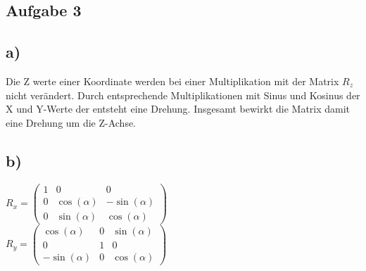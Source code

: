 \documentclass{article}
\begin{document}
	\subsection*{Aufgabe 3}
	\subsection*{a)}
	Die Z werte einer Koordinate werden bei einer Multiplikation mit der Matrix $R_{z}$ nicht verändert. Durch entsprechende Multiplikationen mit Sinus und Kosinus der X und Y-Werte der entsteht eine Drehung. Insgesamt bewirkt die Matrix damit eine Drehung um die Z-Achse.
	\subsection*{b)}
	$R_{x} = 
	\left(
	\begin{array}{ccc}
	1&0&0 \\ 0&\cos(\alpha)&-\sin(\alpha) \\ 0&\sin(\alpha)& \cos(\alpha)
	\end{array}
	\right)
	$ \\
	$R_{y} = 
	\left(
	\begin{array}{ccc}
	\cos(\alpha)&0&\sin(\alpha) \\ 0&1&0 \\ -\sin(\alpha)&0&\cos(\alpha)
	\end{array}
	\right)
	$
\end{document}
